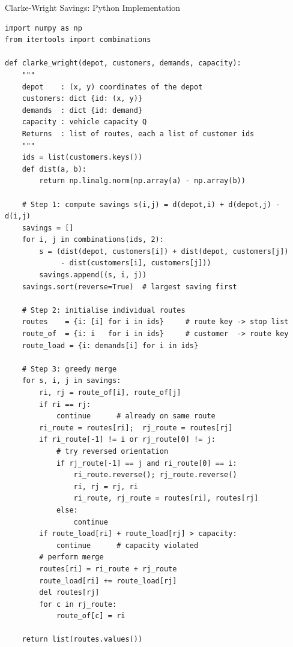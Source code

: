 \documentclass[aspectratio=169,10pt]{beamer}
\begin{document}
\begin{frame}[fragile]{Clarke-Wright Savings: Python Implementation}
  \begin{lstlisting}[caption={Clarke-Wright Savings Algorithm in Python}]
import numpy as np
from itertools import combinations

def clarke_wright(depot, customers, demands, capacity):
    """
    depot    : (x, y) coordinates of the depot
    customers: dict {id: (x, y)}
    demands  : dict {id: demand}
    capacity : vehicle capacity Q
    Returns  : list of routes, each a list of customer ids
    """
    ids = list(customers.keys())
    def dist(a, b):
        return np.linalg.norm(np.array(a) - np.array(b))

    # Step 1: compute savings s(i,j) = d(depot,i) + d(depot,j) - d(i,j)
    savings = []
    for i, j in combinations(ids, 2):
        s = (dist(depot, customers[i]) + dist(depot, customers[j])
             - dist(customers[i], customers[j]))
        savings.append((s, i, j))
    savings.sort(reverse=True)  # largest saving first

    # Step 2: initialise individual routes
    routes    = {i: [i] for i in ids}     # route key -> stop list
    route_of  = {i: i   for i in ids}     # customer  -> route key
    route_load = {i: demands[i] for i in ids}

    # Step 3: greedy merge
    for s, i, j in savings:
        ri, rj = route_of[i], route_of[j]
        if ri == rj:
            continue      # already on same route
        ri_route = routes[ri];  rj_route = routes[rj]
        if ri_route[-1] != i or rj_route[0] != j:
            # try reversed orientation
            if rj_route[-1] == j and ri_route[0] == i:
                ri_route.reverse(); rj_route.reverse()
                ri, rj = rj, ri
                ri_route, rj_route = routes[ri], routes[rj]
            else:
                continue
        if route_load[ri] + route_load[rj] > capacity:
            continue      # capacity violated
        # perform merge
        routes[ri] = ri_route + rj_route
        route_load[ri] += route_load[rj]
        del routes[rj]
        for c in rj_route:
            route_of[c] = ri

    return list(routes.values())
  \end{lstlisting}
\end{frame}
\end{document}
